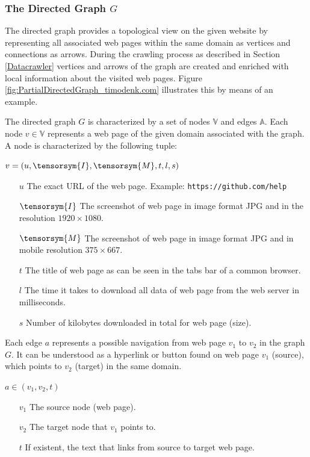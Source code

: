 \subsubsection{The Directed Graph $G$}
\label{TheDirectedGraph}
The directed graph provides a topological view on the given website by representing all associated web pages within the same domain as vertices and connections as arrows. During the crawling process as described in Section \ref{Datacrawler} vertices and arrows of the graph are created and enriched with local information about the visited web pages. Figure \ref{fig:PartialDirectedGraph_timodenk.com} illustrates this by means of an example.

The directed graph $G$ is characterized by a set of nodes $\mathbb{V}$ and edges $\mathbb{A}$. Each node $v \in \mathbb{V}$ represents a web page of the given domain associated with the graph. A node is characterized by the following tuple:

\begin{center}
$v = (u, \tensorsym{I}, \tensorsym{M},t, l, s)$
\begin{itemize}
	\item[$u$] The exact URL of the web page. Example: \texttt{https://github.com/help}
	\item[$\tensorsym{I}$] The screenshot of web page in image format JPG and in the resolution $1920\times1080$.
	\item[$\tensorsym{M}$] The screenshot of web page in image format JPG and in mobile resolution $375\times 667$.
	\item[$t$] The title of web page as can be seen in the tabs bar of a common browser.
	\item[$l$] The time it takes to download all data of web page from the web server in milliseconds.
	\item[$s$] Number of kilobytes downloaded in total for web page (size).
\end{itemize}
\end{center}

Each edge $a$ represents a possible navigation from web page $v_1$ to $v_2$ in the graph $G$. It can be understood as a hyperlink or button found on web page $v_1$ (source), which points to $v_2$ (target) in the same domain. 

\begin{center}
	$a \in (v_1, v_2, t)$
	\begin{itemize}
		\item[$v_1$] The source node (web page).
		\item[$v_2$] The target node that $v_1$ points to.
		\item[$t$] If existent, the text that links from source to target web page.
	\end{itemize}
\end{center}

